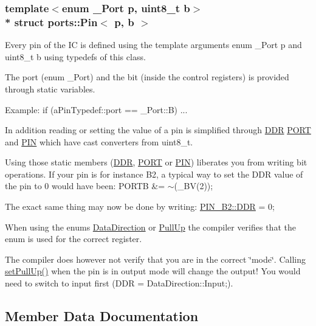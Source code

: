 \subsubsection*{template$<$enum \+\_\+\+Port p, uint8\+\_\+t b$>$\\*
struct ports\+::\+Pin$<$ p, b $>$}

Every pin of the IC is defined using the template arguments {\ttfamily enum \+\_\+\+Port p} and {\ttfamily uint8\+\_\+t b} using {\ttfamily typedef}s of this class. 

The port (enum \+\_\+\+Port) and the bit (inside the control registers) is provided through static variables.

Example\+: {\ttfamily if (a\+Pin\+Typedef\+::port == \+\_\+\+Port\+::B) ...}

In addition reading or setting the value of a pin is simplified through \hyperlink{structports_1_1Pin_aaebb4d6cb5db0635fe8e7d6e7d315c7f}{D\+DR} \hyperlink{structports_1_1Pin_aaa08f0eb17ef31d9f46d65d50c8a093e}{P\+O\+RT} and \hyperlink{structports_1_1Pin_ae2e45a41082457c350f71f7a720265d4}{P\+IN} which have cast converters from uint8\+\_\+t.

Using those static members (\hyperlink{structports_1_1Pin_aaebb4d6cb5db0635fe8e7d6e7d315c7f}{D\+DR}, \hyperlink{structports_1_1Pin_aaa08f0eb17ef31d9f46d65d50c8a093e}{P\+O\+RT} or \hyperlink{structports_1_1Pin_ae2e45a41082457c350f71f7a720265d4}{P\+IN}) liberates you from writing bit operations. If your pin is for instance B2, a typical way to set the D\+DR value of the pin to 0 would have been\+: {\ttfamily P\+O\+R\+TB \&= $\sim$(\+\_\+\+B\+V(2));}

The exact same thing may now be done by writing\+: {\ttfamily \hyperlink{structports_1_1Pin_aaebb4d6cb5db0635fe8e7d6e7d315c7f}{P\+I\+N\+\_\+\+B2\+::\+D\+DR} = 0;}

When using the enums \hyperlink{namespaceports_a46987e78fa447129742fadda5eccafb4}{Data\+Direction} or \hyperlink{namespaceports_a49bf0ccedb4cfed89a328574e53bec07}{Pull\+Up} the compiler verifies that the enum is used for the correct register.

The compiler does however not verify that you are in the correct \char`\"{}mode\char`\"{}. Calling \hyperlink{structports_1_1Pin_a11ba9e7aeda2d867780dee32234f2c7e}{set\+Pull\+Up()} when the pin is in output mode will change the output! You would need to switch to input first ({\ttfamily D\+DR = Data\+Direction\+::\+Input;}). 

\subsection{Member Data Documentation}
